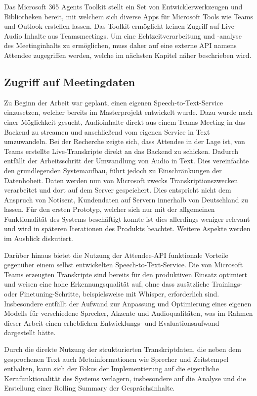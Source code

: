 Das Microsoft 365 Agents Toolkit stellt ein Set von Entwicklerwerkzeugen und Bibliotheken bereit, mit welchem sich diverse Apps für Microsoft Tools wie Teams und Outlook erstellen lassen. Das Toolkit ermöglicht keinen Zugriff auf Live-Audio Inhalte aus Teamsmeetings. Um eine Echtzeitverarbeitung und -analyse des Meetinginhalts zu ermöglichen, muss daher auf eine externe API namens Attendee zugegriffen werden, welche im nächsten Kapitel näher beschrieben wird.  

\subsection{Zugriff auf Meetingdaten}
\label{sec:attendee}
Zu Beginn der Arbeit war geplant, einen eigenen Speech-to-Text-Service einzusetzen, welcher bereits im Masterprojekt entwickelt wurde. Dazu wurde nach einer Möglichkeit gesucht, Audioinhalte direkt aus einem Teams-Meeting in das Backend zu streamen und anschließend vom eigenen Service in Text umzuwandeln. Bei der Recherche zeigte sich, dass Attendee \cite{attendee} in der Lage ist, von Teams erstellte Live-Transkripte direkt an das Backend zu schicken. Dadurch entfällt der Arbeitsschritt der Umwandlung von Audio in Text. Dies vereinfachte den grundlegenden Systemaufbau, führt jedoch zu Einschränkungen der Datenhoheit. 
Daten werden nun von Microsoft zwecks Transkriptionszwecken verarbeitet und dort auf dem Server gespeichert. Dies entspricht nicht dem Anspruch von Notisent, Kundendaten auf Servern innerhalb von Deutschland zu lassen. 
Für den ersten Prototyp, welcher sich nur mit der allgemeinen Funktionalität des Systems beschäftigt konnte ist dies allerdings weniger relevant und wird in späteren Iterationen des Produkts beachtet.
Weitere Aspekte werden im Ausblick diskutiert.

Darüber hinaus bietet die Nutzung der Attendee-API funktionale Vorteile gegenüber einem selbst entwickelten Speech-to-Text-Service. Die von Microsoft Teams erzeugten Transkripte sind bereits für den produktiven Einsatz optimiert und weisen eine hohe Erkennungsqualität auf, ohne dass zusätzliche Trainings- oder Finetuning-Schritte, beispielsweise mit Whisper, erforderlich sind. Insbesondere entfällt der Aufwand zur Anpassung und Optimierung eines eigenen Modells für verschiedene Sprecher, Akzente und Audioqualitäten, was im Rahmen dieser Arbeit einen erheblichen Entwicklungs- und Evaluationsaufwand dargestellt hätte.

Durch die direkte Nutzung der strukturierten Transkriptdaten, die neben dem gesprochenen Text auch Metainformationen wie Sprecher und Zeitstempel enthalten, kann sich der Fokus der Implementierung auf die eigentliche Kernfunktionalität des Systems verlagern, insbesondere auf die Analyse und die Erstellung einer Rolling Summary der Gesprächsinhalte.

